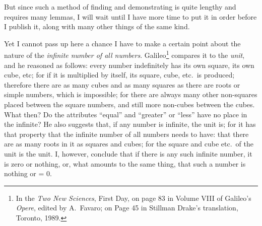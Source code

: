 \documentclass[polutonikogreek,english,twoside,openright]{article}
\begin{document}
But since such a method of finding and demonstrating is quite lengthy and
requires many lemmas, I will wait until I have more time to put it in order
before I publish it, along with many other things of the same
kind.


Yet I cannot pass up here a chance I have to make a certain point about the
nature of the {\em infinite number of all numbers}.  Galileo\footnote{In the {\em Two New Sciences}, First Day, on page 83 in Volume VIII of Galileo's {\em Opere}, edited by A.\ Favaro; on Page 45 in Stillman Drake's translation, Toronto, 1989.} compares it to the {\em unit}, and he reasoned as follows:
every number indefinitely has its own square, its own cube, etc; for if it is
multiplied by itself, its square, cube, etc.\ is produced; therefore there are
as many cubes and as many squares as there are roots or simple numbers, which
is impossible; for there are always many other non-squares placed between the
square numbers, and still more non-cubes between the cubes.  What then?  Do
the attributes ``equal'' and ``greater'' or ``less'' have no place in the
infinite?  He also suggests that, if any number is infinite, the unit is; for
it has that property that the infinite number of all numbers needs to have:
that there are as many roots in it as squares and cubes; for the square and
cube etc.\ of the unit is the unit.  I, however, conclude that if there is any
such infinite number, it is zero or nothing, or, what amounts to the same
thing, that such a number is nothing or = 0.
\end{document}
